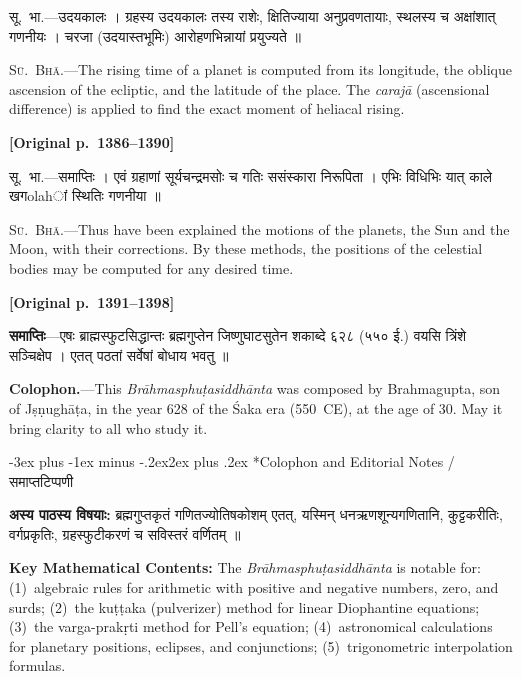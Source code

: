 \documentclass[11pt,a4paper]{article}
\makeatletter
\renewcommand{\section}{\@startsection {section}{1}{\z@}%
  {-3ex plus -1ex minus -.2ex}{2ex plus .2ex}%
  {\normalfont\Large\bfseries\color{sectioncolor}}}
\newcommand{\dev}[1]{{\devanagarifont\mdseries\upshape #1}}
\newcommand{\pagelabel}[1]{\textcolor{sectioncolor}{\textbf{[Original p.~#1]}}}
\newcommand{\bilingualpair}[2]{%
  \noindent%
  \begin{minipage}[t]{0.47\textwidth}
    \begin{flushleft}
      \small\dev{#1}
    \end{flushleft}
  \end{minipage}%
  \hfill\vrule\hfill%
  \begin{minipage}[t]{0.47\textwidth}
    \begin{flushleft}
      \small #2
    \end{flushleft}
  \end{minipage}%
  \par\vspace{1.2ex}
}
\makeatother
\begin{document}
\bilingualpair{%
सू.~भा.---उदयकालः । ग्रहस्य उदयकालः तस्य राशेः, क्षितिज्याया अनुप्रवणतायाः, स्थलस्य च अक्षांशात् गणनीयः । चरजा (उदयास्तभूमिः) आरोहणभिन्नायां प्रयुज्यते ॥
}{%
\textsc{Sū.~Bhā.}---The rising time of a planet is computed from its longitude, the oblique ascension of the ecliptic, and the latitude of the place. The \textit{carajā} (ascensional difference) is applied to find the exact moment of heliacal rising.
}

\vspace{0.5ex}
\pagelabel{1386--1390}

\bilingualpair{%
सू.~भा.---समाप्तिः । एवं ग्रहाणां सूर्यचन्द्रमसोः च गतिः ससंस्कारा निरूपिता । एभिः विधिभिः यात् काले खगolahां स्थितिः गणनीया ॥
}{%
\textsc{Sū.~Bhā.}---Thus have been explained the motions of the planets, the Sun and the Moon, with their corrections. By these methods, the positions of the celestial bodies may be computed for any desired time.
}

\vspace{0.5ex}
\pagelabel{1391--1398}

\bilingualpair{%
\textbf{समाप्तिः}---एषः ब्राह्मस्फुटसिद्धान्तः ब्रह्मगुप्तेन जिष्णुघाटसुतेन शकाब्दे ६२८ (५५० ई.) वयसि त्रिंशे सञ्चिक्षेप । एतत् पठतां सर्वेषां बोधाय भवतु ॥
}{%
\textbf{Colophon.}---This \textit{Brāhmasphuṭasiddhānta} was composed by Brahmagupta, son of Jṣṇughāṭa, in the year 628 of the Śaka era (550~CE), at the age of 30. May it bring clarity to all who study it.
}

\newpage

\section*{Colophon and Editorial Notes / \dev{समाप्तटिप्पणी}}

\bilingualpair{%
\textbf{अस्य पाठस्य विषयाः:} ब्रह्मगुप्तकृतं गणितज्योतिषकोशम् एतत्, यस्मिन् धनऋणशून्यगणितानि, कुट्टकरीतिः, वर्गप्रकृतिः, ग्रहस्फुटीकरणं च सविस्तरं वर्णितम् ॥
}{%
\textbf{Key Mathematical Contents:} The \textit{Brāhmasphuṭasiddhānta} is notable for: (1)~algebraic rules for arithmetic with positive and negative numbers, zero, and surds; (2)~the kuṭṭaka (pulverizer) method for linear Diophantine equations; (3)~the varga-prakṛti method for Pell's equation; (4)~astronomical calculations for planetary positions, eclipses, and conjunctions; (5)~trigonometric interpolation formulas.
}
\end{document}
